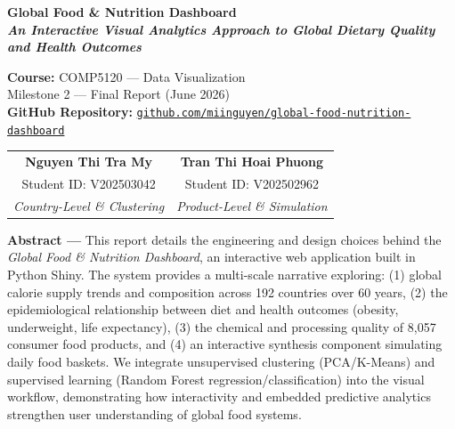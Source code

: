 \documentclass[10pt, a4paper]{article}
\newenvironment{SummaryBox}{%
  \begin{tcolorbox}[
    enhanced, breakable,
    colback=lightgray, colframe=primary,
    boxrule=0.8pt, arc=4pt,
    left=8pt, right=8pt, top=6pt, bottom=6pt,
    before skip=6pt, after skip=6pt,
  ]%
}{%
  \end{tcolorbox}%
}
\begin{document}
\fontsize{9.5pt}{11.2pt}\selectfont

\begin{center}
  \vspace*{1.5cm}
  
  {\Huge\bfseries\color{primary}Global Food \& Nutrition Dashboard} \\[10pt]
  {\Large\bfseries\color{accent}\textit{An Interactive Visual Analytics Approach to Global Dietary Quality and Health Outcomes}} \\[15pt]
  
  \vspace{2cm}
  
  {\large\textbf{Course:} COMP5120 --- Data Visualization} \\[6pt]
  {\large\color{midgray}Milestone 2 --- Final Report (June 2026)} \\[12pt]
  {\small\textbf{GitHub Repository:} \href{https://github.com/miinguyen/global-food-nutrition-dashboard}{\texttt{github.com/miinguyen/global-food-nutrition-dashboard}}} \\[1.8cm]
  
  \begin{tabular}{cc}
    \textbf{Nguyen Thi Tra My} & \textbf{Tran Thi Hoai Phuong} \\
    Student ID: V202503042 & Student ID: V202502962 \\
    \textit{Country-Level \& Clustering} & \textit{Product-Level \& Simulation} \\
  \end{tabular}
\end{center}

\vfill

\begin{SummaryBox}
\small
\textbf{Abstract ---} This report details the engineering and design choices behind the \textit{Global Food \& Nutrition Dashboard}, an interactive web application built in Python Shiny. The system provides a multi-scale narrative exploring: (1) global calorie supply trends and composition across 192 countries over 60 years, (2) the epidemiological relationship between diet and health outcomes (obesity, underweight, life expectancy), (3) the chemical and processing quality of 8,057 consumer food products, and (4) an interactive synthesis component simulating daily food baskets. We integrate unsupervised clustering (PCA/K-Means) and supervised learning (Random Forest regression/classification) into the visual workflow, demonstrating how interactivity and embedded predictive analytics strengthen user understanding of global food systems.
\end{SummaryBox}
\end{document}

